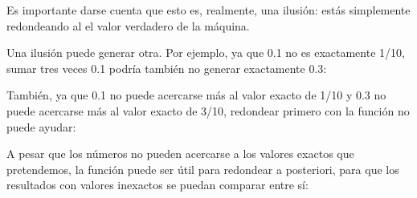 \documentclass[a4,10pt,spanish]{sphinxmanual}
\begin{document}
\sphinxAtStartPar
Es importante darse cuenta que esto es, realmente, una ilusión: estás simplemente redondeando al  el valor verdadero de la máquina.

\sphinxAtStartPar
Una ilusión puede generar otra.  Por ejemplo, ya que 0.1 no es exactamente 1/10, sumar tres veces 0.1 podría también no generar exactamente 0.3:

\begin{sphinxVerbatim}[commandchars=\\\{\}]
      
\end{sphinxVerbatim}

\sphinxAtStartPar
También, ya que 0.1 no puede acercarse más al valor exacto de 1/10 y 0.3 no puede acercarse más al valor exacto de 3/10, redondear primero con la función  no puede ayudar:

\begin{sphinxVerbatim}[commandchars=\\\{\}]
          
\end{sphinxVerbatim}

\sphinxAtStartPar
A pesar que los números no pueden acercarse a los valores exactos que pretendemos, la función  puede ser útil para redondear a posteriori, para que los resultados con valores inexactos se puedan comparar entre sí:

\begin{sphinxVerbatim}[commandchars=\\\{\}]
        
\end{sphinxVerbatim}
\end{document}
